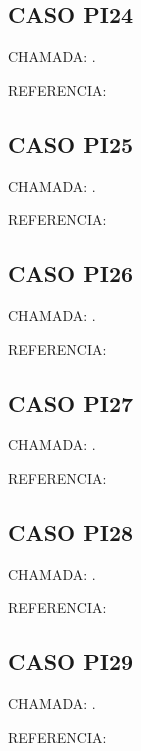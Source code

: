 \documentclass{undftex}
\begin{document}
\begin{refsection}\section*{CASO PI24} CHAMADA: . \textcite{pi24}\par REFERENCIA:\par\printbibliography[heading=none,check=undfconsultadas]\end{refsection}\clearpage
\begin{refsection}\section*{CASO PI25} CHAMADA: . \textcite{pi25}\par REFERENCIA:\par\printbibliography[heading=none,check=undfconsultadas]\end{refsection}\clearpage
\begin{refsection}\section*{CASO PI26} CHAMADA: . \textcite{pibook}\par REFERENCIA:\par\printbibliography[heading=none,check=undfconsultadas]\end{refsection}\clearpage
\begin{refsection}\section*{CASO PI27} CHAMADA: . \textcite{pi27}\par REFERENCIA:\par\printbibliography[heading=none,check=undfconsultadas]\end{refsection}\clearpage
\begin{refsection}\section*{CASO PI28} CHAMADA: . \textcite{pi28}\par REFERENCIA:\par\printbibliography[heading=none,check=undfconsultadas]\end{refsection}\clearpage
\begin{refsection}\section*{CASO PI29} CHAMADA: . \textcite{pi29}\par REFERENCIA:\par\printbibliography[heading=none,check=undfconsultadas]\end{refsection}\clearpage
\end{document}
